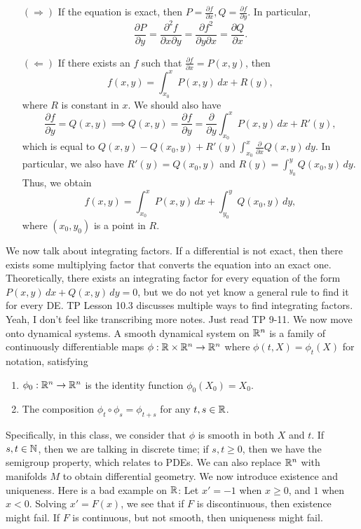 \begin{itemize}
    \item[$(\Rightarrow)$] If the equation is exact, then $P = \frac{\partial f}{\partial x}, Q = \frac{\partial f}{\partial y}$. In particular,
    \[ \frac{\partial P}{\partial y} = \frac{\partial^2 f}{\partial x \partial y} = \frac{\partial f^2}{\partial y \partial x} = \frac{\partial Q}{\partial x}. \]
    \item[$(\Leftarrow)$] If there exists an $f$ such that $\frac{\partial f}{\partial x} = P(x, y)$, then
    \[ f(x, y) = \int_{x_0}^x P(x, y) \, dx + R(y), \]
    where $R$ is constant in $x$. We should also have
    \[ \frac{\partial f}{\partial y} = Q(x, y) \implies Q(x, y) = \frac{\partial f}{\partial y} = \frac{\partial}{\partial y} \int_{x_0}^x P(x, y) \, dx + R'(y), \]
    which is equal to $Q(x, y) - Q(x_0, y) + R'(y) \int_{x_0}^x \frac{\partial}{\partial x} Q(x, y) \, dy$. In particular, we also have $R'(y) = Q(x_0, y)$ and $R(y) = \int_{y_0}^y Q(x_0, y) \, dy$. Thus, we obtain
    \[ f(x, y) = \int_{x_0}^x P(x, y) \, dx + \int_{y_0}^y Q(x_0, y) \, dy, \]
    where $(x_0, y_0)$ is a point in $R$.
\end{itemize}
We now talk about integrating factors. If a differential is not exact, then there exists some multiplying factor that converts the equation into an exact one. Theoretically, there exists an integrating factor for every equation of the form $P(x, y) \, dx + Q(x, y) \, dy = 0$, but we do not yet know a general rule to find it for every DE. TP Lesson 10.3 discusses multiple ways to find integrating factors.
\medskip\newline
Yeah, I don't feel like transcribing more notes. Just read TP 9-11.
\medskip\newline
We now move onto dynamical systems. A smooth dynamical system on $\mathbb R^n$ is a family of continuously differentiable maps $\phi : \mathbb R \times \mathbb R^n \to \mathbb R^n$ where $\phi(t, X) = \phi_t(X)$ for notation, satisfying
\begin{enumerate}[label=(\roman*)]
    \item $\phi_0 : \mathbb R^n \to \mathbb R^n$ is the identity function $\phi_0(X_0) = X_0$.
    \item The composition $\phi_t \circ \phi_s = \phi_{t+s}$ for any $t, s \in \mathbb R$.
\end{enumerate}
Specifically, in this class, we consider that $\phi$ is smooth in both $X$ and $t$. If $s, t \in \mathbb N$, then we are talking in discrete time; if $s, t \geq 0$, then we have the semigroup property, which relates to PDEs. We can also replace $\mathbb R^n$ with manifolds $M$ to obtain differential geometry. We now introduce existence and uniqueness.
\medskip\newline
Here is a bad example on $\mathbb R$: Let $x' = -1$ when $x \geq 0$, and $1$ when $x < 0$. Solving $x' = F(x)$, we see that if $F$ is discontinuous, then existence might fail. If $F$ is continuous, but not smooth, then uniqueness might fail.